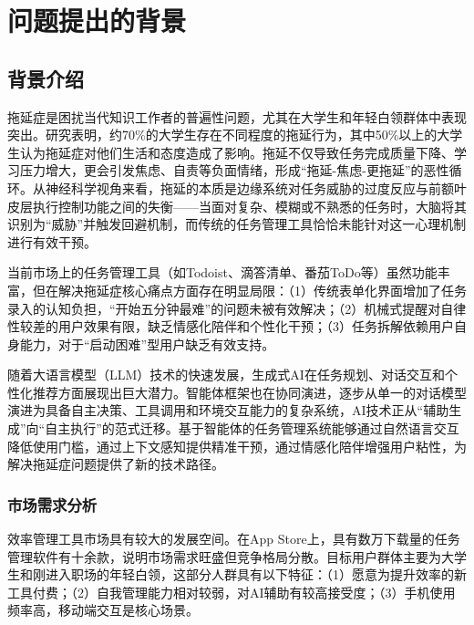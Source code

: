 \setlength{\parindent}{2em}

\section{问题提出的背景}

\subsection{背景介绍}

\par 拖延症是困扰当代知识工作者的普遍性问题，尤其在大学生和年轻白领群体中表现突出。研究表明，约70\%的大学生存在不同程度的拖延行为，其中50\%以上的大学生认为拖延症对他们生活和态度造成了影响\cite{SJTY201919049}。拖延不仅导致任务完成质量下降、学习压力增大，更会引发焦虑、自责等负面情绪，形成“拖延-焦虑-更拖延”的恶性循环。从神经科学视角来看，拖延的本质是边缘系统对任务威胁的过度反应与前额叶皮层执行控制功能之间的失衡——当面对复杂、模糊或不熟悉的任务时，大脑将其识别为“威胁”并触发回避机制，而传统的任务管理工具恰恰未能针对这一心理机制进行有效干预\cite{denmark2010zeigarnik}。

\par 当前市场上的任务管理工具（如Todoist\cite{todoist}、滴答清单\cite{dida365}、番茄ToDo\cite{tomatodo}等）虽然功能丰富，但在解决拖延症核心痛点方面存在明显局限：（1）传统表单化界面增加了任务录入的认知负担，“开始五分钟最难”的问题未被有效解决；（2）机械式提醒对自律性较差的用户效果有限，缺乏情感化陪伴和个性化干预；（3）任务拆解依赖用户自身能力，对于“启动困难”型用户缺乏有效支持。

\par 随着大语言模型（LLM）技术的快速发展，生成式AI在任务规划、对话交互和个性化推荐方面展现出巨大潜力\cite{cao2023comprehensivesurveyaigeneratedcontent}。智能体框架也在协同演进，逐步从单一的对话模型演进为具备自主决策、工具调用和环境交互能力的复杂系统，AI技术正从“辅助生成”向“自主执行”的范式迁移。基于智能体的任务管理系统能够通过自然语言交互降低使用门槛，通过上下文感知提供精准干预，通过情感化陪伴增强用户粘性，为解决拖延症问题提供了新的技术路径。

\subsubsection{市场需求分析}

\par 效率管理工具市场具有较大的发展空间。在App Store上，具有数万下载量的任务管理软件有十余款，说明市场需求旺盛但竞争格局分散。目标用户群体主要为大学生和刚进入职场的年轻白领，这部分人群具有以下特征：（1）愿意为提升效率的新工具付费；（2）自我管理能力相对较弱，对AI辅助有较高接受度\cite{tresna2025fear}；（3）手机使用频率高，移动端交互是核心场景。

